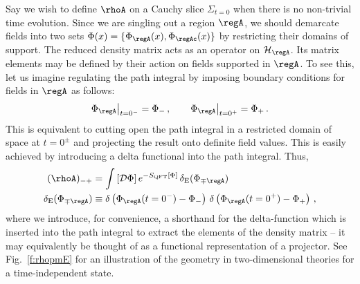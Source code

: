 \documentclass[12pt,openany]{book}
\begin{document}
Say we wish to define $\rhoA$ on a Cauchy slice $\Sigma_{t=0}$ when there is no non-trivial time evolution. Since we are singling out a region $\regA$, we should demarcate fields into two sets $\Phi(x) =\{ \Phi_\regA(x), \Phi_{\regAc}(x)\}$ by restricting their domains of support. The reduced density matrix  acts as an operator on ${\cal H}_\regA$. Its matrix elements may be defined by their action on fields supported in
$\regA$. To see this, let us imagine regulating the path integral by imposing boundary conditions for
fields in $\regA$ as follows:
%
\begin{equation}
\Phi_{\regA} \big|_{t=0^-}= \Phi_- \,, \qquad  \Phi_{\regA} \big|_{t= 0^+} = \Phi_+ \,.
\label{eq:bcA}
\end{equation}
%
This is equivalent to cutting open the path integral in a restricted domain of space at $t=0^\pm$ and projecting the result onto definite field values. This is easily achieved by introducing a delta functional into the path integral. Thus,
%
\begin{align}
(\rhoA)_{-+}
&=
  \int\, [{\cal D} \Phi] \, e^{-S_\text{QFT}[\Phi]} \, \delta_\text{E}(\Phi_{\mp \regA})
\nonumber \\
\delta_\text{E}(\Phi_{\mp \regA})
& \equiv
   \delta\left(\Phi_{\regA} (t=0^-) -  \Phi_- \right)\, \delta\left(\Phi_{\regA} (t=0^+)- \Phi_+ \right) \,,
\label{eq:rhoAE}
\end{align}
%
where we  introduce, for convenience, a shorthand for the delta-function which is  inserted into the path integral to extract the elements of the density matrix -- it may equivalently be thought of as a functional representation of a projector. See Fig.~\ref{f:rhopmE} for an illustration of the geometry in two-dimensional theories for a time-independent state.
\end{document}

